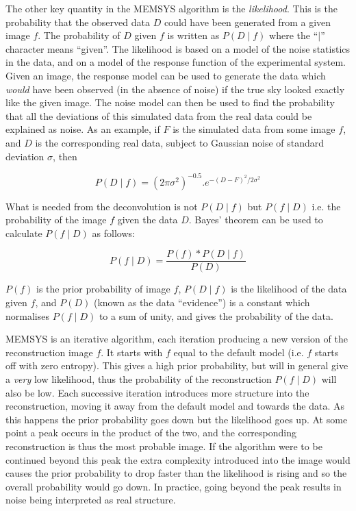 The other key quantity in the MEMSYS algorithm is the {\em likelihood}. This is
the probability that the observed data $D$ could have been generated from a
given image $f$. The probability of $D$ given $f$  is written as $P( D \mid f )$
where the ``$\mid$'' character means ``given''. The likelihood is based on a
model of the noise statistics in the data, and on a model of the response
function of the experimental system. Given an image, the response model can be
used to generate the data which {\em would} have been observed (in the absence
of noise) if the true sky looked exactly like the given image. The noise model
can then be used to find the probability that all the deviations of
this simulated data from the real data could be explained as noise. As an
example, if $F$ is the simulated data from some image $f$, and $D$ is the
corresponding real data, subject to Gaussian noise of standard deviation
$\sigma$, then

\begin{equation}
P(D \mid f) = (2\pi\sigma^{2})^{-0.5}.e^{-(D-F)^{2}/2\sigma^{2}}
\end{equation}

What is needed from the deconvolution is not $P( D \mid f)$ but $P( f \mid D)$
i.e. the probability of the image $f$ given the data $D$. Bayes' theorem can be
used to calculate $P( f \mid D )$ as follows:

\begin{equation}
P(f \mid D) =\frac{P(f)*P(D \mid f)}{P(D)} \label{EQ:BAYES}
\end{equation}

$P(f)$ is the prior probability of image $f$, $P( D \mid f )$ is the likelihood
of  the data given $f$, and $P(D)$ (known as the data ``evidence'') is a
constant  which normalises $P( f \mid D )$ to a sum of unity, and gives the
probability of  the data.

MEMSYS is an iterative algorithm, each iteration producing a new version of
the reconstruction image $f$. It starts with $f$ equal to the default model
(i.e. $f$ starts off with zero entropy).  This gives a high prior probability,
but will in general give a {\em very} low likelihood, thus the probability of
the reconstruction $P(f \mid D)$ will  also be low. Each successive iteration
introduces more structure into the  reconstruction, moving it away from the
default model and towards the data. As  this happens the prior probability goes
down but the likelihood goes up. At some  point a peak occurs in the product of
the two, and the corresponding  reconstruction is thus the most probable image.
If the algorithm were to be  continued beyond this peak the extra complexity
introduced into the image would causes the  prior probability to drop faster
than the likelihood is rising and so the overall  probability would go down. In
practice, going beyond the peak results in noise  being interpreted as real
structure.

